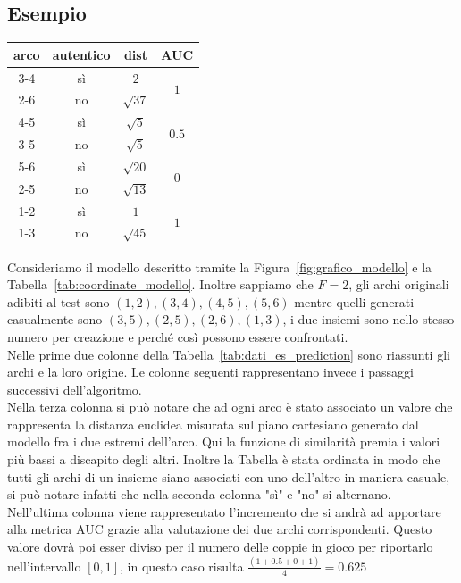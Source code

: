 \subsection{Esempio}
\begin{center}
	\begin{tabular}{|c|c|c|c|}
		\hline
		arco & autentico & dist & AUC\\
		\hline
		3-4 & sì & $2$ & \multirow{2}{*}{$1$}\\
		2-6 & no & $\sqrt{37}$ & \\
		\hline
		4-5 & sì & $\sqrt{5}$ & \multirow{2}{*}{$0.5$}\\
		3-5 & no & $\sqrt{5}$ & \\
		\hline
		5-6 & sì & $\sqrt{20}$ & \multirow{2}{*}{$0$}\\
		2-5 & no & $\sqrt{13}$ & \\
		\hline
		1-2 & sì & $1$ & \multirow{2}{*}{$1$}\\
		1-3 & no & $\sqrt{45}$ & \\
		\hline
	\end{tabular}
	\label{tab:dati_es_prediction}
\end{center}
Consideriamo il modello descritto tramite la Figura~\ref{fig:grafico_modello} e la Tabella~\ref{tab:coordinate_modello}. Inoltre sappiamo che $F=2$, gli archi originali adibiti al test sono $(1, 2), (3, 4), (4, 5), (5, 6)$ mentre quelli generati casualmente sono $(3, 5), (2, 5), (2, 6), (1, 3)$, i due insiemi sono nello stesso numero per creazione e perché così possono essere confrontati.\\
Nelle prime due colonne della Tabella~\ref{tab:dati_es_prediction} sono riassunti gli archi e la loro origine. Le colonne seguenti rappresentano invece i passaggi successivi dell'algoritmo.\\
Nella terza colonna si può notare che ad ogni arco è stato associato un valore che rappresenta la distanza euclidea misurata sul piano cartesiano generato dal modello fra i due estremi dell'arco. Qui la funzione di similarità premia i valori più bassi a discapito degli altri. Inoltre la Tabella è stata ordinata in modo che tutti gli archi di un insieme siano associati con uno dell'altro in maniera casuale, si può notare  infatti che nella seconda colonna "sì" e "no" si alternano.\\
Nell'ultima colonna viene rappresentato l'incremento che si andrà ad apportare alla metrica AUC grazie alla valutazione dei due archi corrispondenti. Questo valore dovrà poi esser diviso per il numero delle coppie in gioco per riportarlo nell'intervallo $[0, 1]$, in questo caso risulta $\displaystyle \frac{\left( 1+0.5+0+1 \right)}{4} = 0.625$\\
